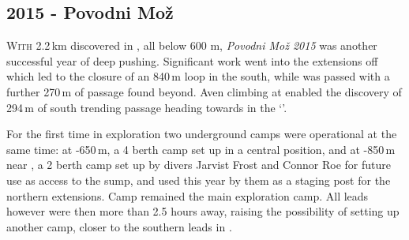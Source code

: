 \newpage
\begin{tcolorbox}
\chapter{2015 - Povodni Mo\v{z}}
		\lettrine{W}{ith} 2.2\,km discovered in , all below 600 m, \emph{Povodni Mo\v{z} 2015} was another successful year of deep pushing. Significant work went into the extensions off  which led to the closure of an 840\,m loop in the south, while  was passed with a further 270\,m of passage found beyond. Aven climbing at  enabled the discovery of 294\,m of south trending passage heading towards  in the `'. 

		For the first time in  exploration two underground camps were operational at the same time: at -650\,m, a 4 berth camp set up in a central position, and  at -850\,m near , a 2 berth camp set up by divers Jarvist Frost and Connor Roe for future use as access to the  sump, and used this year by them as a staging post for the northern extensions. Camp  remained the main exploration camp. All leads however were then more than 2.5 hours away, raising the possibility of setting up another camp, closer to the southern leads in .
	

\end{tcolorbox}
\BgThispage



